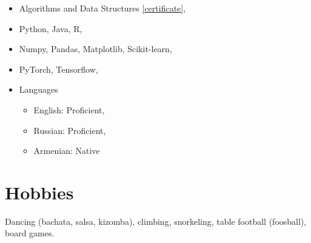 \documentclass[11pt,a4paper,sans]{moderncv}        %
\begin{document}
\begin{itemize}
    \item Algorithms and Data Structures \href{https://artomaranjyan.github.io/files/Algorithms-and-Data-Structures.jpg}{[certificate]},
    \item Python, Java, R,
    \item Numpy, Pandas, Matplotlib, Scikit-learn,
    \item PyTorch, Tensorflow,
    \item Languages
        \begin{itemize}
        \item English: Proficient, 
        \item Russian: Proficient,
        \item Armenian: Native 
        \end{itemize}
\end{itemize}


\section{Hobbies}
Dancing (bachata, salsa, kizomba), climbing, snorkeling, table football (foosball), board games.



% 


\end{document}
